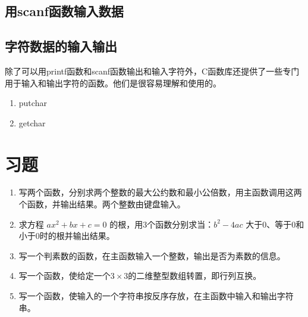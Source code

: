 \subsection{用scanf函数输入数据}
\subsection{字符数据的输入输出}
除了可以用printf函数和scanf函数输出和输入字符外，C函数库还提供了一些专门用于输入和输出字符的函数。他们是很容易理解和使用的。
\begin{enumerate}
	\item putchar
	\item getchar
\end{enumerate}

\section{习题}
\begin{enumerate}
	\item 写两个函数，分别求两个整数的最大公约数和最小公倍数，用主函数调用这两个函数，并输出结果。两个整数由键盘输入。
	\item 求方程 $ax^2 + bx + c = 0$ 的根，用3个函数分别求当：$b^2 - 4ac$ 大于0、等于0和小于0时的根并输出结果。
	\item 写一个判素数的函数，在主函数输入一个整数，输出是否为素数的信息。
	\item 写一个函数，使给定一个$3 \times 3$的二维整型数组转置，即行列互换。
	\item 写一个函数，使输入的一个字符串按反序存放，在主函数中输入和输出字符串。
\end{enumerate}
